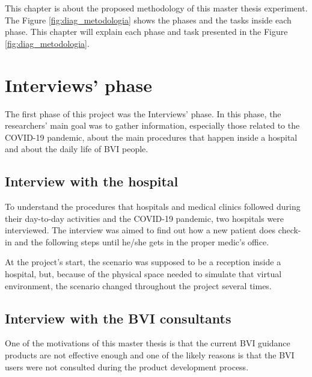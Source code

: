 



This chapter is about the proposed methodology of this master thesis experiment. The Figure \ref{fig:diag_metodologia} shows the phases and the tasks inside each phase. This chapter will explain each phase and task presented in the Figure \ref{fig:diag_metodologia}.



\section{Interviews' phase}
\label{sec:interviews_phase}
    The first phase of this project was the Interviews' phase. In this phase, the researchers' main goal was to gather information, especially those related to the COVID-19 pandemic, about the main procedures that happen inside a hospital and about the daily life of BVI people.

    \subsection{Interview with the hospital}
    
        To understand the procedures that hospitals and medical clinics followed during their day-to-day activities and the COVID-19 pandemic, two hospitals were interviewed. The interview was aimed to find out how a new patient does check-in and the following steps until he/she gets in the proper medic's office.
        
        At the project's start, the scenario was supposed to be a reception inside a hospital, but, because of the physical space needed to simulate that virtual environment, the scenario changed throughout the project several times.

    \subsection{Interview with the BVI consultants}
    
        One of the motivations of this master thesis is that the current BVI guidance products are not effective enough and one of the likely reasons is that the BVI users were not consulted during the product development process.
    
